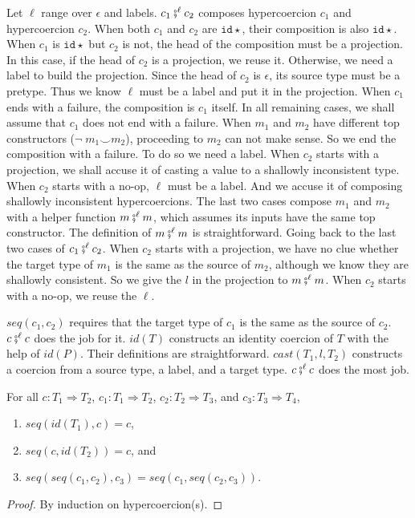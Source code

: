 \documentclass[acmsmall,review,anonymous]{acmart}\settopmatter{printfolios=true,printccs=false,printacmref=false}
\newcommand{\lazyD}{Lazy\;D}
\newcommand{\hyperCoercionI}[0]{\mathtt{id\star}}
\begin{document}
Let $ \ell $ range over $ \epsilon $ and labels.
$ c_1 \fatsemi^\ell c_2 $ composes hypercoercion $ c_1 $ and hypercoercion $ 
c_2 $.
When both $ c_1 $ and $ c_2 $ are $ \hyperCoercionI $, their 
composition is also $ \hyperCoercionI $.
When $ c_1 $ is $ \hyperCoercionI $ but $ c_2 $ is not, the head of the 
composition must be a projection. In this 
case, if the head of $ c_2 $ is a projection, we reuse it. Otherwise, we need a 
label to build the projection. Since the head of $ c_2 $ is $ \epsilon $, its 
source type must be a pretype. Thus we know $ \ell $ must be a label and put it 
in the projection. 
When $ c_1 $ ends with a failure, the composition is $ c_1 $ itself. In all 
remaining cases, we shall assume that $ c_1 $ does not end with 
a failure.
When $ m_1 $ and $ m_2 $ have different top constructors ($ \neg\;m_1 \smile 
m_2 $), proceeding to $ m_2 $ can not make sense. So we end the composition 
with a failure. To do so we need a label. When $ c_2 $ starts with a 
projection, we shall accuse it of casting a value to a shallowly inconsistent 
type. When $ c_2 $ starts with a no-op, $ \ell $ must be a label. And we accuse 
it of composing shallowly inconsistent hypercoercions. The last two cases 
compose $ m_1 $ and $ m_2 $ with a helper function $ m \fatsemi^\ell m $, which 
assumes its inputs have the same top constructor. The definition of $ m 
\fatsemi^\ell m $ is straightforward. Going back to the last two cases of $ c_1 
\fatsemi^\ell c_2 $. When $ c_2 $ starts with a projection, we have no clue 
whether the target type of $ m_1 $ is the same as the source of $ m_2 $, 
although we know they are shallowly consistent. So we give the $ l $ in the 
projection to $ m \fatsemi^\ell m $. When $ c_2 $ starts with a no-op, we reuse 
the $ \ell $.

$ seq(c_1,c_2) $ requires that the target type of $ c_1 $ is the same as the 
source of $ c_2 $. $ c \fatsemi^\ell c $ does the job for it.
$ id(T) $ constructs an identity coercion of $ T $ with the help of $ id(P) $. 
Their definitions are straightforward.
$ cast(T_1,l,T_2) $ constructs a coercion from a source type, a label, and a 
target type. $ c \fatsemi^\ell c $ does the most job.

\begin{proposition}[\lazyD\ hypercoercion is a monoid]
	\label{thm:hc-monoid}
	For all $c : T_1 \Longrightarrow T_2$,
	$c_1 : T_1 \Longrightarrow T_2$,
	$c_2 : T_2 \Longrightarrow T_3$, and
	$c_3 : T_3 \Longrightarrow T_4$,
	\begin{enumerate}
		\item $seq(id(T_1),c) = c$,
		\item $seq(c,id(T_2)) = c$, and
		\item $seq(seq(c_1, c_2), c_3) = seq(c_1, seq(c_2, c_3))$.
	\end{enumerate}
\end{proposition}
\begin{proof}
	By induction on hypercoercion(s).
\end{proof}
\end{document}
